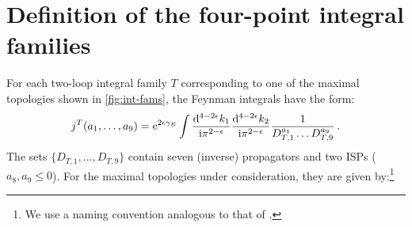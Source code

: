 \documentclass[main.tex]{subfiles}
\begin{document}
\chapter{Definition of the four-point integral families} \label{app:int_def}
For each two-loop integral family $T$ corresponding to one of the maximal topologies shown in \cref{fig:int-fams}, the Feynman integrals have the form:
\begin{equation}
	j^{T}(a_1, \ldots, a_9) = \mathrm{e}^{2 \epsilon \gamma_{E}} \int \frac{\mathrm{d}^{4-2\epsilon} k_1}{\mathrm{i} \pi^{2-\epsilon}} \frac{\mathrm{d}^{4-2\epsilon} k_2}{\mathrm{i} \pi^{2-\epsilon}} \frac{1}{D_{T,1}^{a_1} \ldots D_{T,9}^{a_9}} \,.
\end{equation}
The sets $\{D_{T,1}, \ldots, D_{T,9}\}$ contain seven (inverse) propagators and two ISPs ($a_8, a_9 \le 0$). 
For the maximal topologies under consideration, they are given by:\footnote{We use a naming convention analogous to that of .}
\end{document}
